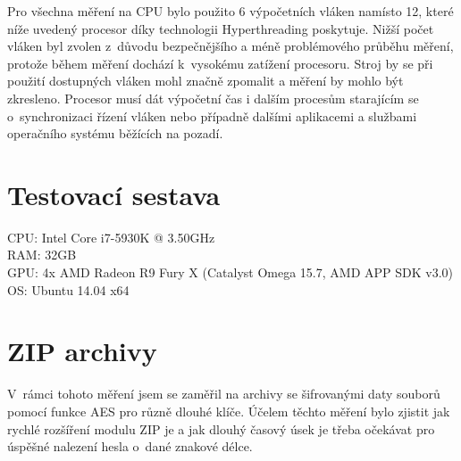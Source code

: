 Pro všechna měření na CPU bylo použito 6 výpočetních vláken namísto 12, které níže uvedený
procesor díky technologii Hyperthreading poskytuje. Nižší počet vláken byl zvolen z~důvodu
bezpečnějšího a méně problémového průběhu měření, protože během měření dochází k~vysokému zatížení
procesoru. Stroj by se při použití dostupných vláken mohl značně zpomalit a měření by mohlo být
zkresleno. Procesor musí dát výpočetní čas i dalším procesům starajícím se o~synchronizaci řízení vláken
nebo případně dalšími aplikacemi a službami operačního systému běžících na pozadí.  

\section{Testovací sestava}
CPU: Intel Core i7-5930K @ 3.50GHz\\
RAM: 32GB\\
GPU: 4x AMD Radeon R9 Fury X (Catalyst Omega 15.7, AMD APP SDK v3.0)\\
OS: Ubuntu 14.04 x64
\section{ZIP archivy}
V~rámci tohoto měření jsem se zaměřil na archivy se šifrovanými daty souborů pomocí funkce AES
pro různě dlouhé klíče. Účelem těchto měření bylo zjistit jak rychlé rozšíření modulu ZIP je a
jak dlouhý časový úsek je třeba očekávat pro úspěšné nalezení hesla o~dané znakové délce. 

